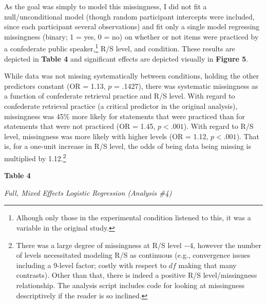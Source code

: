 \documentclass[12pt]{article}  %
\begin{document}
As the goal was simply to model this missingness, I did not fit a null/unconditional model (though random participant intercepts were included, since each participant several observations) and fit only a single model regressing missingness (binary; 1 = yes, 0 = no) on whether or not items were practiced by a confederate public speaker,\footnote{Alhough only those in the experimental condition listened to this, it was a variable in the original study.} R/S level, and condition. These results are depicted in \textbf{Table 4} and significant effects are depicted visually in \textbf{Figure 5}.

While data was not missing systematically between conditions, holding the other predictors constant (OR = 1.13, $p$ = .1427), there was systematic missingness as a function of confederate retrieval practice and R/S level. With regard to confederate retrieval practice (a critical predictor in the original analysis), missingness was 45\% more likely for statements that were practiced than for statements that were not practiced (OR = 1.45, $p < .001$). With regard to R/S level, missingness was more likely with higher levels (OR = 1.12, $p < .001$). That is, for a one-unit increase in R/S level, the odds of being data being missing is multiplied by 1.12.\footnote{There was a large degree of missingness at R/S level $-$4, however the number of levels necessitated modeling R/S as continuous (e.g., convergence issues including a 9-level factor; costly with respect to $df$ making that many contrasts). Other than that, there is indeed a positive R/S level/missingness relationship. The analysis script includes code for looking at missingness descriptively if the reader is so inclined.}


\newpage

\textbf{Table 4}

\textit{Full, Mixed Effects Logistic Regression (Analysis \#4)}

\vspace{0.5cm}
\end{document}
